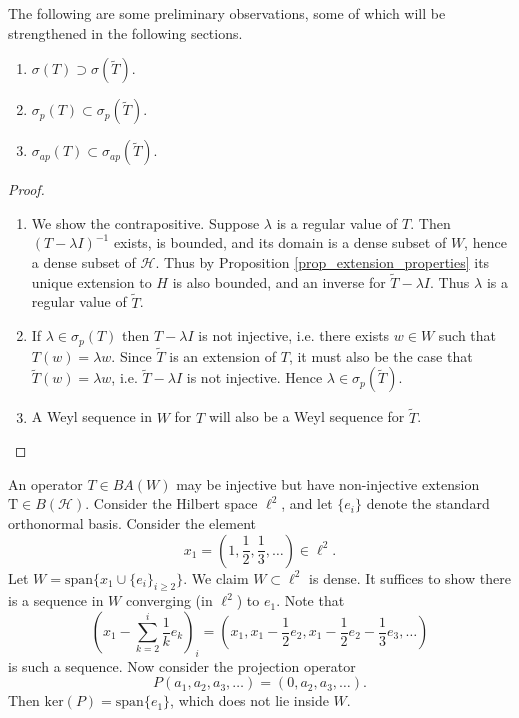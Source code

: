 \documentclass[12pt]{article}
\begin{document}
The following are some preliminary observations, some of which will be strengthened in the following sections.
\begin{proposition}
\label{prop_basic_spectrum_inclusions}
	\hfill
	\begin{enumerate}
		\item $\sigma(T)\supset\sigma(\tilde{T})$.
		\item $\sigma_p(T)\subset \sigma_p(\tilde{T})$.
		\item $\sigma_{ap}(T)\subset\sigma_{ap}(\tilde{T})$.
	\end{enumerate}
\end{proposition}
\begin{proof}
	\hfill
	\begin{enumerate}
		\item We show the contrapositive. Suppose $\lambda$ is a regular value of $T$. Then $(T-\lambda I)^{-1}$ exists, is bounded, and its domain is a dense subset of $W$, hence a dense subset of $\mathcal{H}$. Thus by Proposition \ref{prop_extension_properties} its unique extension to $H$ is also bounded, and an inverse for $\tilde{T}-\lambda I$. Thus $\lambda$ is a regular value of $\tilde{T}$.  
		\item If $\lambda\in\sigma_p(T)$ then $T-\lambda I$ is not injective, i.e. there exists $w\in W$ such that $T(w)=\lambda w$. Since $\tilde{T}$ is an extension of $T$, it must also be the case that $\tilde{T}(w)=\lambda w$, i.e. $\tilde{T}-\lambda I$ is not injective. Hence $\lambda\in\sigma_p(\tilde{T})$.
		\item A Weyl sequence in $W$ for $T$ will also be a Weyl sequence for $\tilde{T}$.
	\end{enumerate}
\end{proof}

\begin{remark}
	An operator $T\in BA(W)$ may be injective but have non-injective extension $\text{T}\in B(\mathcal{H})$. Consider the Hilbert space $\ell^2$, and let $\{e_i\}$ denote the standard orthonormal basis. Consider the element 
	\begin{equation*}
		x_1 = (1, \frac{1}{2}, \frac{1}{3}, \dots) \in \ell^2.
	\end{equation*}
	Let $W = \text{span}\{x_1\cup \{e_i\}_{i\geq 2}\}$. We claim $W\subset \ell^2$ is dense. It suffices to show there is a sequence in $W$ converging (in $\ell^2$) to $e_1$. Note that 
	\begin{equation*}
		\left( x_1 - \sum_{k=2}^{i}\frac{1}{k}e_k \right)_i = \left( x_1, x_1 - \frac{1}{2}e_2, x_1 - \frac{1}{2}e_2 - \frac{1}{3}e_3, \dots \right)
	\end{equation*}
	is such a sequence. Now consider the projection operator 
	\begin{equation*}
		P(a_1,a_2,a_3,\dots) = (0, a_2, a_3, \dots).
	\end{equation*}
	Then $\text{ker}(P)=\text{span}\{e_1\}$, which does not lie inside $W$.
\end{remark}
\end{document}
